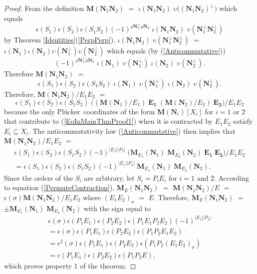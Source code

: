 \documentclass[12pt]{article}
\theoremstyle{definition}
\newcommand{\Is}{\ensuremath{\iota}}
\newcommand{\Vs}{\ensuremath{\upsilon}}
\newcommand{\Card}[1]{\ensuremath{{\left|#1\right|}}}
\newcommand{\ext}[1]{\ensuremath{\mathbf{#1}}}
\newcommand{\Plucker}{Pl\"{u}cker\ }
\begin{document}
\begin{proof}
From the definition $\ext{M}(\ext{N}_1\ext{N}_2)$ $=$
$\Is(\ext{N}_1\ext{N}_2)\;\Vs\big((\ext{N}_1\ext{N}_2)^\perp\big)$
which equals
\[
\epsilon(S_1)\epsilon(S_2)\epsilon(S_1S_2)
(-1)^{\rho\ext{N}_1^\perp\rho\ext{N}_2}\;
\Is(\ext{N}_1\ext{N}_2)\;\Vs(\ext{N}_1^\perp\ext{N}_2^\perp)
\]
by Theorem \ref{Identities}(\ref{PerpPerp}).
$\Is(\ext{N}_1\ext{N}_2)\;\Vs(\ext{N}_1^\perp\ext{N}_2^\perp)$ $=$
$\Is(\ext{N}_1)\Is(\ext{N}_2)\Vs(\ext{N}_1^\perp)\Vs(\ext{N}_2^\perp)$
which equals (by (\ref{Anticommutative}))
\[
(-1)^{\rho\ext{N}_1^\perp\rho\ext{N}_2}
\;\Is(\ext{N}_1)\;\Vs(\ext{N}_1^\perp)\;\Is(\ext{N}_2)\;\Vs(\ext{N}_2^\perp).
\]
Therefore $\ext{M}(\ext{N}_1\ext{N}_2)$ $=$
\begin{equation}
\label{EqInMainThmProof1}
\epsilon(S_1)\epsilon(S_2)\epsilon(S_1S_2)
\;\Is(\ext{N}_1)\;\Vs(\ext{N}_1^\perp)\;\Is(\ext{N}_2)\;\Vs(\ext{N}_2^\perp).
\end{equation}
Therefore, 
$\ext{M}(\ext{N}_1\ext{N}_2)/E_1E_2$ $=$
\[
\epsilon(S_1)\epsilon(S_2)\epsilon(S_1S_2)\;
\big((\ext{M}(\ext{N}_1)/E_1)\;\ext{E_1}\;
(\ext{M}(\ext{N}_2)/E_2)\;\ext{E_2}\big)/E_1E_2
\]
because the only \Plucker coordinates of the form
$\ext{M}(\ext{N}_i)[X_i]$ for $i=1$ or $2$ that 
contribute to (\ref{EqInMainThmProof1}) when it is contracted
by $E_1E_2$ satisfy $E_i\subseteq X_i$.  
The anticommutativity law 
(\ref{Anticommutative}) then
implies that $\ext{M}(\ext{N}_1\ext{N}_2)/E_1E_2$ $=$
\begin{equation*}
\begin{split}
\epsilon(S_1)\epsilon(S_2)\epsilon(S_1S_2)(-1)^{\Card{E_1}\Card{P_2}}
\;\big(\ext{M}_{E_1}(\ext{N}_1)\;
 \ext{M}_{E_2}(\ext{N}_2)\;\ext{E_1}\;\ext{E_2}\big)/E_1E_2\\
=\epsilon(S_1)\epsilon(S_2)\epsilon(S_1S_2)(-1)^{\Card{E_1}\Card{P_2}}
\;\ext{M}_{E_1}(\ext{N}_1)\;\ext{M}_{E_2}(\ext{N}_2).
\end{split}
\end{equation*}
Since the orders of the $S_i$ are arbitrary, let $S_i=P_iE_i$ for $i=1$ 
and $2$.
According to equation (\ref{PermuteContraction}),
$\ext{M}_E(\ext{N}_1\ext{N}_2)$ $=$ $\ext{M}(\ext{N}_1\ext{N}_2)/E$ $=$
$\epsilon(\sigma)\ext{M}(\ext{N}_1\ext{N}_2)/E_1E_2$ where $(E_1E_2)_\sigma$
$=$ $E$.  Therefore, $\ext{M}_E(\ext{N}_1\ext{N}_2)$ $=$
$\pm\ext{M}_{E_1}(\ext{N}_1)\;\ext{M}_{E_2}(\ext{N}_2)$ 
with the sign equal to
\begin{equation*}
\begin{split}
\epsilon(\sigma)
\epsilon(P_1E_1)\epsilon(P_2E_2)\epsilon(P_1E_1P_2E_2)
(-1)^{\Card{E_1}\Card{P_2}}\\
=
\epsilon(\sigma)
\epsilon(P_1E_1)\epsilon(P_2E_2)\epsilon(P_1P_2E_1E_2)\\
=
\epsilon^2(\sigma)
\epsilon(P_1E_1)\epsilon(P_2E_2)\epsilon(P_1P_2(E_1E_2)_\sigma)\\
=
\epsilon(P_1E_1)\epsilon(P_2E_2)\epsilon(P_1P_2E),
\end{split}
\end{equation*}
which proves property 1 of the theorem.


\end{proof}
\end{document}
